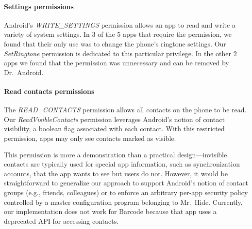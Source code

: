\documentclass[preprint]{sig-alternate-10pt}
\newcommand{\lib}{Mr.\ Hide\xspace}
\newcommand{\rewriter}{Dr.\ Android\xspace}
\newcommand{\perm}[1]{\textsf{\textit{#1}}}
\newcommand{\comment}[3][\color{red}]{}%
\newcommand{\tdm}[1]{\comment[\color{red}]{TDM}{#1}}
\newcommand{\polAdsBlindName}{\perm{AdsPrivate}\xspace}
\newcommand{\polAnonUsageName}{\perm{AnonUsage}\xspace}
\begin{document}

\paragraph*{Settings permissions}  Android's \perm{WRITE\_SETTINGS}
permission allows an app to read and write a variety of system
settings.  In 3 of the 5 apps that require the permission, we found
that their only use was to change the phone's ringtone settings.  Our
\perm{SetRingtone} permission is dedicated to this particular
privilege.  In the other 2 apps we found that the permission was
unnecessary and can be removed by \rewriter.  

\paragraph*{Read contacts permissions}  The \perm{READ\_CONTACTS}
permission allows all contacts on the phone to be read.  Our
\perm{ReadVisibleContacts} permission leverages Android's notion of
contact visibility, a boolean flag associated with each
contact. With this restricted permission, apps may only see contacts
marked as visible.

This permission is more a demonstration than a practical
design---invisible contacts are typically used for special app
information, such as synchronization accounts, that the app wants to
see but users do not. However, it would be straightforward to
generalize our approach to support Android's notion of contact groups (e.g.,
friends, colleagues) or to enforce an arbitrary 
per-app security policy controlled by 
a master configuration program belonging to \lib.
Currently, our implementation does not work for Barcode
because that app uses a deprecated API for accessing contacts.  %


\end{document}
